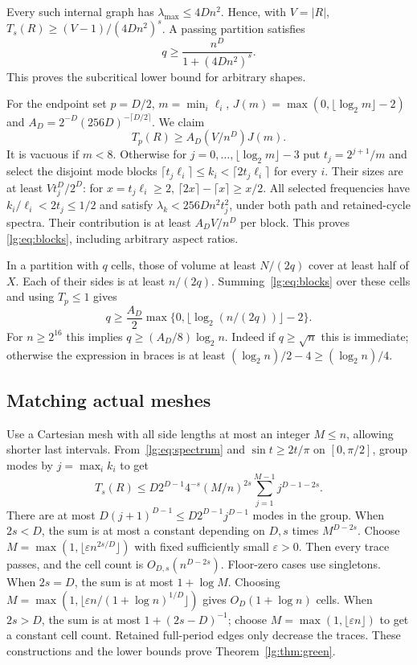 Every such internal graph has $\lambda_{\max}\le4Dn^2$. Hence, with
$V=|R|$, $T_s(R)\ge(V-1)/(4Dn^2)^s$. A passing partition satisfies
\begin{equation}\label{lg:eq:subcrit}
 q\ge\frac{n^D}{1+(4Dn^2)^s}.
\end{equation}
This proves the subcritical lower bound for arbitrary shapes.

For the endpoint set $p=D/2$, $m=\min_i\ell_i$,
$J(m)=\max(0,\lfloor\log_2m\rfloor-2)$ and
$A_D=2^{-D}(256D)^{-\lceil D/2\rceil}$. We claim
\begin{equation}\label{lg:eq:blocks}
 T_p(R)\ge A_D(V/n^D)J(m).
\end{equation}
It is vacuous if $m<8$. Otherwise for
$j=0,\ldots,\lfloor\log_2m\rfloor-3$ put $t_j=2^{j+1}/m$ and select
the disjoint mode blocks
$\lceil t_j\ell_i\rceil\le k_i<\lceil2t_j\ell_i\rceil$ for every $i$.
Their sizes are at least $Vt_j^D/2^D$: for $x=t_j\ell_i\ge2$,
$\lceil2x\rceil-\lceil x\rceil\ge x/2$.
All selected frequencies have $k_i/\ell_i<2t_j\le1/2$ and satisfy
$\lambda_k<256Dn^2t_j^2$, under both path and retained-cycle spectra.
Their contribution is at least $A_DV/n^D$ per block. This proves
\eqref{lg:eq:blocks}, including arbitrary aspect ratios.

In a partition with $q$ cells, those of volume at least $N/(2q)$ cover
at least half of $X$. Each of their sides is at least $n/(2q)$.
Summing~\eqref{lg:eq:blocks} over these cells and using $T_p\le1$ gives
\[
 q\ge\frac{A_D}{2}
 \max\{0,\lfloor\log_2(n/(2q))\rfloor-2\}.
\]
For $n\ge2^{16}$ this implies $q\ge(A_D/8)\log_2 n$.
Indeed if $q\ge\sqrt n$ this is immediate; otherwise the expression in
braces is at least $(\log_2 n)/2-4\ge(\log_2 n)/4$.

\subsection{Matching actual meshes}
Use a Cartesian mesh with all side lengths at most an integer $M\le n$,
allowing shorter last intervals. From~\eqref{lg:eq:spectrum} and
$\sin t\ge2t/\pi$ on $[0,\pi/2]$, group modes by $j=\max_i k_i$ to get
\begin{equation}\label{lg:eq:upper}
 T_s(R)\le D2^{D-1}4^{-s}(M/n)^{2s}
          \sum_{j=1}^{M-1}j^{D-1-2s}.
\end{equation}
There are at most $D(j+1)^{D-1}\le D2^{D-1}j^{D-1}$ modes in the group.
When $2s<D$, the sum is at most a constant depending on $D,s$ times
$M^{D-2s}$. Choose $M=\max(1,\lfloor\varepsilon n^{2s/D}\rfloor)$
with fixed sufficiently small $\varepsilon>0$. Then every trace passes,
and the cell count is $O_{D,s}(n^{D-2s})$. Floor-zero cases use singletons.
When $2s=D$, the sum is at most $1+\log M$. Choosing
$M=\max(1,\lfloor\varepsilon n/(1+\log n)^{1/D}\rfloor)$ gives
$O_D(1+\log n)$ cells. When $2s>D$, the sum is at most
$1+(2s-D)^{-1}$; choose $M=\max(1,\lfloor\varepsilon n\rfloor)$
to get a constant cell count. Retained full-period edges only decrease
the traces. These constructions and the lower bounds prove
Theorem~\ref{lg:thm:green}.

